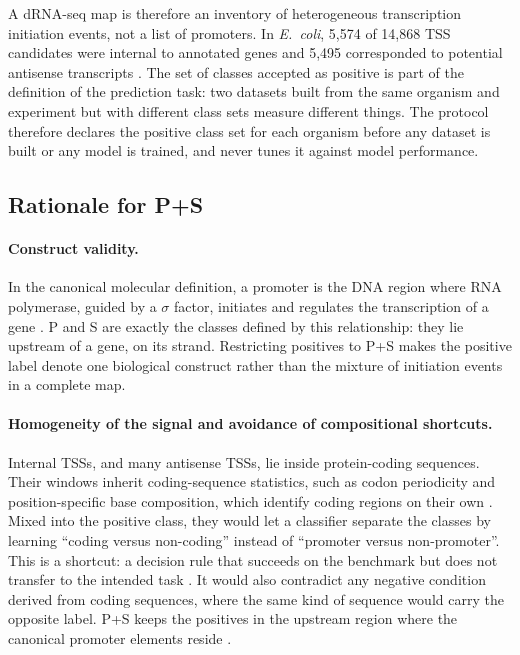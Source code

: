 A dRNA-seq map is therefore an inventory of heterogeneous transcription
initiation events, not a list of promoters. In \textit{E.~coli}, 5,574 of
14,868 TSS candidates were internal to annotated genes and 5,495 corresponded
to potential antisense transcripts \citep{thomason2015ecoli}. The set of
classes accepted as positive is part of the definition of the prediction task:
two datasets built from the same organism and experiment but with different
class sets measure different things. The protocol therefore declares the
positive class set for each organism before any dataset is built or any model
is trained, and never tunes it against model performance.

\subsection{Rationale for P+S}

\paragraph{Construct validity.}
In the canonical molecular definition, a promoter is the DNA region where RNA
polymerase, guided by a $\sigma$ factor, initiates and regulates the
transcription of a gene \citep{browning2016regulation}. P and S are exactly the
classes defined by this relationship: they lie upstream of a gene, on its
strand. Restricting positives to P+S makes the positive label denote one
biological construct rather than the mixture of initiation events in a
complete map.

\paragraph{Homogeneity of the signal and avoidance of compositional shortcuts.}
Internal TSSs, and many antisense TSSs, lie inside protein-coding sequences.
Their windows inherit coding-sequence statistics, such as codon periodicity and
position-specific base composition, which identify coding regions on their own
\citep{fickett1982coding}. Mixed into the positive class, they would let a
classifier separate the classes by learning ``coding versus non-coding''
instead of ``promoter versus non-promoter''. This is a shortcut: a decision
rule that succeeds on the benchmark but does not transfer to the intended task
\citep{geirhos2020shortcut}. It would also contradict any negative condition
derived from coding sequences, where the same kind of sequence would carry the
opposite label. P+S keeps the positives in the upstream region where the
canonical promoter elements reside \citep{browning2016regulation}.


